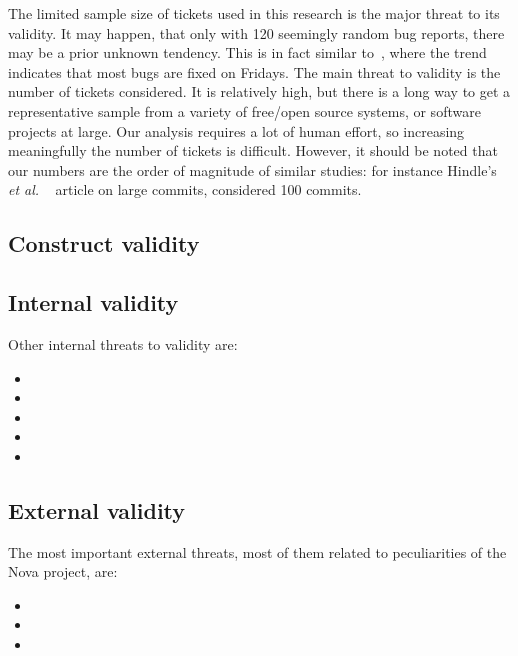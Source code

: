 \documentclass[a4paper, 12pt]{book}
\begin{document}
The limited sample size of tickets used in this research is the major threat to its validity. It may happen, that only with 120 seemingly random bug reports, there may be a prior unknown tendency. This is in fact similar to~\cite{sliwerski2005changes}, where the trend indicates that most bugs are fixed on Fridays.
The main threat to validity is the number of tickets considered. It is relatively high, but there is a long way to get a representative sample from a variety of free/open source systems, or software projects at large. Our analysis requires a lot of human effort, so increasing meaningfully the number of tickets is difficult. However, it should be noted that our numbers are the order of magnitude of similar studies: for instance Hindle's \emph{et al.} ~\cite{hindle2008large} article on large commits, considered 100 commits.

\subsection{Construct validity}
\subsection{Internal validity}
Other internal threats to validity are:

\begin{itemize}
    \item
    \item 
    \item
    \item 
    \item
\end{itemize}

\subsection{External validity}
The most important external threats, most of them related to peculiarities of the Nova project, are:

\begin{itemize}
    \item 
    \item 
    \item 
\end{itemize}
\end{document}
